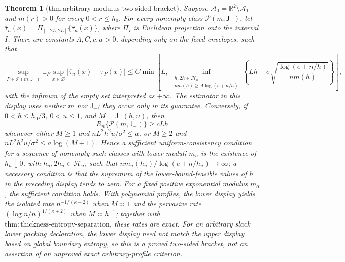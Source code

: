 \documentclass{article}
\newtheorem{theorem}{Theorem}
\begin{document}
\begin{theorem}[thm:arbitrary-modulus-two-sided-bracket]\label{thm:arbitrary-modulus-two-sided-bracket}
Suppose \(\mathcal A_0=\mathbb R^2\setminus\mathcal A_1\) and \(m(r)>0\) for every \(0<r\le h_0\). For every nonempty class \(\mathcal P(m,\mathsf J_{-})\), let \(\overline\tau_n(x)=\Pi_{[-2L,2L]}\{\widehat\tau_n(x)\}\), where \(\Pi_I\) is Euclidean projection onto the interval \(I\). There are constants \(A,C,c,a>0\), depending only on the fixed envelopes, such that
\[
 \sup_{P\in\mathcal P(m,\mathsf J_{-})}
 \mathbb E_P\sup_{x\in\mathcal B}|\overline\tau_n(x)-\tau_P(x)|
 \le C\min\left[ L,\ 
 \inf_{\substack{h,2h\in\mathcal H_n\\nm(h)\ge A\log(e+n/h)}}
 \left\{Lh+\sigma\sqrt{\frac{\log(e+n/h)}{nm(h)}}\right\}\right],
\]
with the infimum of the empty set interpreted as \(+\infty\). The estimator in this display uses neither \(m\) nor \(\mathsf J_{-}\); they occur only in its guarantee. Conversely, if \(0<h\le h_0/3\), \(0<u\le1\), and \(M=\mathsf J_{-}(h,u)\), then
\[
 R_n\{\mathcal P(m,\mathsf J_{-})\}\ge cLh
\]
whenever either \(M\ge1\) and \(nL^2h^2u/\sigma^2\le a\), or \(M\ge2\) and \(nL^2h^2u/\sigma^2\le a\log(M+1)\). Hence a sufficient uniform-consistency condition for a sequence of nonempty such classes with lower moduli \(m_n\) is the existence of \(h_n\downarrow0\), with \(h_n,2h_n\in\mathcal H_n\), such that \(nm_n(h_n)/\log(e+n/h_n)\to\infty\); a necessary condition is that the supremum of the lower-bound-feasible values of \(h\) in the preceding display tends to zero. For a fixed positive exponential modulus \(m_\alpha\), the sufficient condition holds. With polynomial profiles, the lower display yields the isolated rate \(n^{-1/(\kappa+2)}\) when \(M\asymp1\) and the pervasive rate \((\log n/n)^{1/(\kappa+2)}\) when \(M\asymp h^{-1}\); together with \(\mathrm{thm:thickness\text{-}entropy\text{-}separation}\), these rates are exact. For an arbitrary slack lower packing declaration, the lower display need not match the upper display based on global boundary entropy, so this is a proved two-sided bracket, not an assertion of an unproved exact arbitrary-profile criterion.
\end{theorem}
\end{document}
